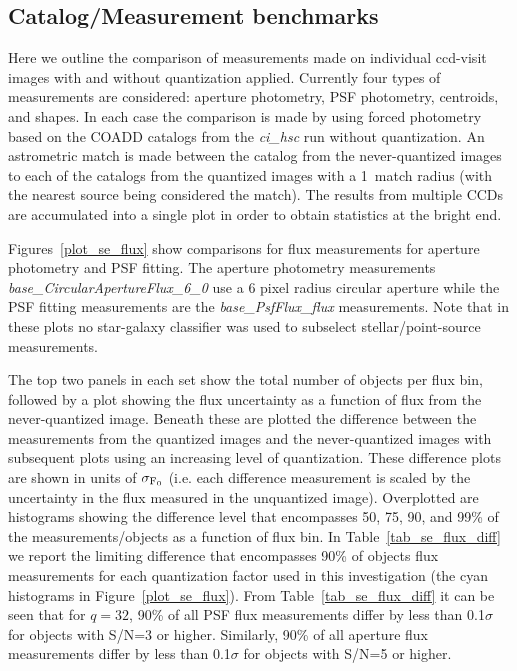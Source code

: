 \clearpage

\subsection{Catalog/Measurement benchmarks}

Here we outline the comparison of measurements made on individual ccd-visit images with and without 
quantization applied.  Currently four types of measurements are considered: aperture photometry, 
PSF photometry, centroids, and shapes.  In each case the comparison is made by using forced 
photometry based on the COADD catalogs from the {\it ci\_hsc} run without quantization.
An astrometric match is made between the catalog from the never-quantized images to each of the
catalogs from the quantized images with a 1\arcsec\ match radius (with the nearest source being
considered the match).  The results from multiple CCDs are accumulated into a single plot in order
to obtain statistics at the bright end.

Figures~\ref{plot_se_flux} show comparisons for flux measurements for aperture photometry 
and PSF fitting.  The aperture photometry measurements {\it base\_CircularApertureFlux\_6\_0} 
use a 6 pixel radius circular aperture while the PSF fitting measurements are the
{\it base\_PsfFlux\_flux} measurements.  Note that in these plots no star-galaxy classifier 
was used to subselect stellar/point-source measurements.

The top two panels in each set show the total number of objects per flux bin, followed by a plot 
showing the flux uncertainty as a function of flux from the never-quantized image.  Beneath these 
are plotted the difference between the measurements from the quantized images and the never-quantized 
images with subsequent plots using an increasing level of quantization.  These difference 
plots are shown in units of $\sigma_{\rm F_0}$ (i.e. each difference measurement is scaled by the
uncertainty in the flux measured in the unquantized image).  Overplotted are histograms showing the 
difference level that encompasses 50, 75, 90, and 99\% of the measurements/objects as a function 
of flux bin.  In Table~\ref{tab_se_flux_diff} we report the limiting difference that encompasses
90\% of objects flux measurements for each quantization factor used in this investigation (the cyan
histograms in Figure~\ref{plot_se_flux}).  From Table~\ref{tab_se_flux_diff} it can be seen
that for $q=32$, 90\% of all PSF flux measurements differ by less than 0.1$\sigma$ for objects 
with S/N=3 or higher.   Similarly, 90\% of all aperture flux measurements differ by less than 0.1$\sigma$
for objects with S/N=5 or higher.


